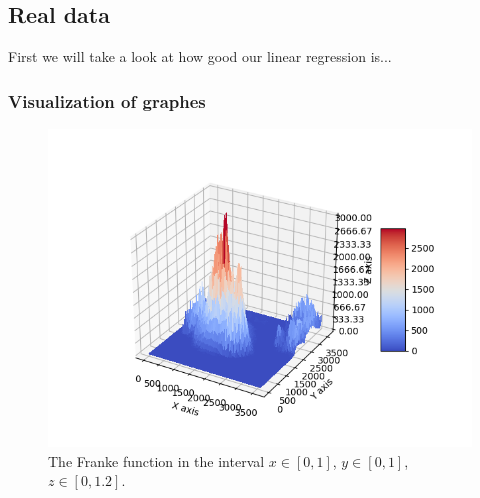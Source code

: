 \subsection{Real data}
First we will take a look at how good our linear regression is...
\subsubsection{Visualization of graphes}

 \begin{figure} [H]
 	\centering
 	\includegraphics[scale=0.8]{../plots/lombok.png}
 	\caption{The Franke function in the interval $x\in[0,1]$, $y\in[0,1]$, $z\in[0, 1.2]$.}
 	\label{fig:lombok}
 \end{figure}

